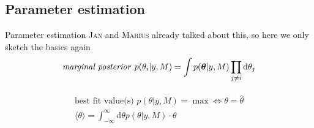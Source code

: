 \documentclass[11pt,aspectratio=1610,dvipsnames]{beamer}
\begin{document}
\subsection{Parameter estimation}
\begin{frame}{Parameter estimation}
	\textsc{Jan} and \textsc{Marius} already talked about this, so here we only sketch the basics again
	\begin{equation}
		\label{eq:marp}
		\text{\emph{marginal posterior }}p(\theta_i|y,M)=\int p(\boldsymbol{\theta}|y,M)\prod_{j\neq i}\text{d}{\theta_j}
	\end{equation}

\begin{align}
	\begin{split}
		\text{best fit value(s) }p(\theta|y,M)=\max \Leftrightarrow \theta=\hat{\theta}\\
		\langle\theta\rangle=\int_{-\infty}^{\infty}\text{d}\theta  p(\theta|y,M)\cdot\theta
	\end{split}
\end{align}
\raggedleft
\citet{sivia}
\end{frame}
\end{document}
